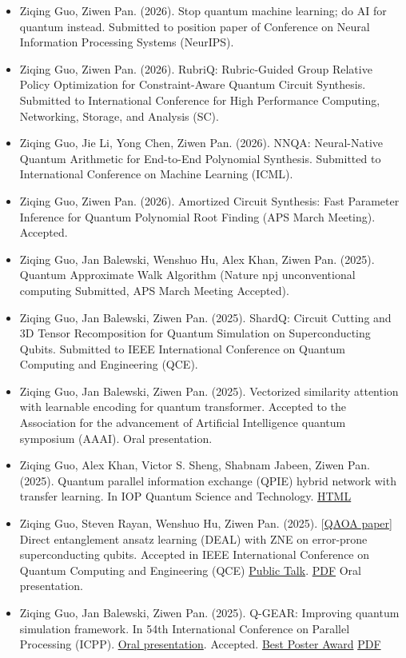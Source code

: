 \documentclass[10pt, letterpaper]{article}
\newenvironment{bulletentries}{%
    \begin{itemize}[topsep=0.10cm, parsep=0.10cm, partopsep=0pt, itemsep=0pt,
                    leftmargin=10pt]
}{%
    \end{itemize}%
}
\newcommand{\tealhref}[2]{\href{#1}{\textcolor{linkcolor}{#2}}}
\begin{document}
\begin{bulletentries}
\item Ziqing Guo, Ziwen Pan. (2026). Stop quantum machine learning; do AI for
      quantum instead. Submitted to position paper of Conference on Neural
      Information Processing Systems (NeurIPS).
\item Ziqing Guo, Ziwen Pan. (2026). RubriQ: Rubric-Guided Group Relative Policy
      Optimization for Constraint-Aware Quantum Circuit Synthesis. Submitted to
      International Conference for High Performance Computing, Networking,
      Storage, and Analysis (SC).
\item Ziqing Guo, Jie Li, Yong Chen, Ziwen Pan. (2026). NNQA: Neural-Native
      Quantum Arithmetic for End-to-End Polynomial Synthesis. Submitted to
      International Conference on Machine Learning (ICML).
\item Ziqing Guo, Ziwen Pan. (2026). Amortized Circuit Synthesis: Fast Parameter
      Inference for Quantum Polynomial Root Finding (APS March Meeting).
      Accepted.
\item Ziqing Guo, Jan Balewski, Wenshuo Hu, Alex Khan, Ziwen Pan. (2025).
      Quantum Approximate Walk Algorithm (Nature npj unconventional computing
      Submitted, APS March Meeting Accepted).
\item Ziqing Guo, Jan Balewski, Ziwen Pan. (2025). ShardQ: Circuit Cutting and 3D
      Tensor Recomposition for Quantum Simulation on Superconducting Qubits.
      Submitted to IEEE International Conference on Quantum Computing and
      Engineering (QCE).
\item Ziqing Guo, Jan Balewski, Ziwen Pan. (2025). Vectorized similarity
      attention with learnable encoding for quantum transformer. Accepted to the
      Association for the advancement of Artificial Intelligence quantum
      symposium (AAAI). Oral presentation.
\item Ziqing Guo, Alex Khan, Victor S. Sheng, Shabnam Jabeen, Ziwen Pan. (2025).
      Quantum parallel information exchange (QPIE) hybrid network with transfer
      learning. In IOP Quantum Science and Technology.
      \href{https://iopscience.iop.org/article/10.1088/2058-9565/ade89f}{HTML}
\item Ziqing Guo, Steven Rayan, Wenshuo Hu, Ziwen Pan. (2025).
      [\tealhref{https://github.com/gzquse/DEAL_QUBO}{QAOA paper}] Direct
      entanglement ansatz learning (DEAL) with ZNE on error-prone
      superconducting qubits. Accepted in IEEE International Conference on
      Quantum Computing and Engineering (QCE)
      \tealhref{https://www.youtube.com/watch?v=FQ0yvO-82IA}{Public Talk}.
      \href{https://arxiv.org/pdf/2504.04021}{PDF} Oral presentation.
\item Ziqing Guo, Jan Balewski, Ziwen Pan. (2025). Q-GEAR: Improving quantum
      simulation framework. In 54th International Conference on Parallel
      Processing (ICPP).
      \tealhref{https://ssl.linklings.net/conferences/icpp/icpp2025_proceedings/views/at_a_glance.html}{Oral presentation}.
      Accepted.
      \tealhref{https://drive.google.com/drive/folders/1G_AqgbxvtGS_LbnAqlTEVEZeR1Xt8x46?usp=sharing}{Best Poster Award}
      \href{https://arxiv.org/pdf/2504.03967}{PDF}
\end{bulletentries}
\end{document}
